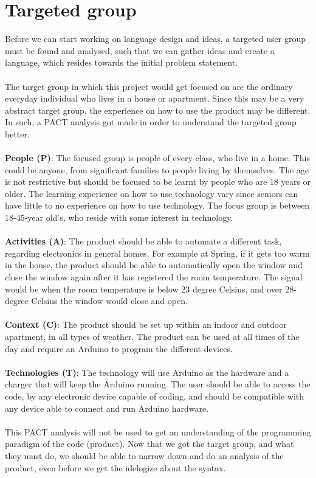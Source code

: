 \section{Targeted group}
\label{targetedGroup}
Before we can start working on language design and ideas, a targeted user group must be found and analysed, such that we can gather ideas and create a language, which resides towards the initial problem statement.  \\ 
\\ 
The target group in which this project would get focused on are the ordinary everyday individual who lives in a house or apartment. Since this may be a very abstract target group, the experience on how to use the product may be different. In such, a PACT analysis got made in order to understand the targeted group better. \\ 
\\ 
\textbf{People (P)}: The focused group is people of every class, who live in a home. This could be anyone, from significant families to people living by themselves. The age is not restrictive but should be focused to be learnt by people who are 18 years or older. The learning experience on how to use technology vary since seniors can have little to no experience on how to use technology. The focus group is between 18-45-year old's, who reside with some interest in technology.\\ 
\\ 
\textbf{Activities (A)}: The product should be able to automate a different task, regarding electronics in general homes. For example at Spring, if it gets too warm in the house, the product should be able to automatically open the window and close the window again after it has registered the room temperature. The signal would be when the room temperature is below 23 degree Celsius, and over 28-degree Celsius the window would close and open.  \\ 
\\ 
\textbf{Context (C)}: The product should be set up within an indoor and outdoor apartment, in all types of weather. The product can be used at all times of the day and require an Arduino to program the different devices.\\ 
\\ 
\textbf{Technologies (T)}: The technology will use Arduino as the hardware and a charger that will keep the Arduino running. The user should be able to access the code, by any electronic device capable of coding, and should be compatible with any device able to connect and run Arduino hardware. \\ 
\\ 
This PACT analysis will not be used to get an understanding of the programming paradigm of the code (product). Now that we got the target group, and what they must do, we should be able to narrow down and do an analysis of the product, even before we get the idelogize about the syntax. %
